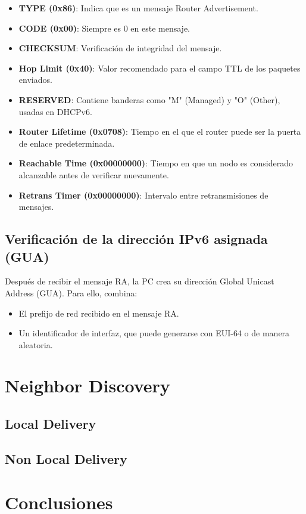 \documentclass[]{article}
\begin{document}
	\begin{itemize}
		\item \textbf{TYPE (0x86)}: Indica que es un mensaje Router Advertisement.
		\item \textbf{CODE (0x00)}: Siempre es 0 en este mensaje.
		\item \textbf{CHECKSUM}: Verificación de integridad del mensaje.
		\item \textbf{Hop Limit (0x40)}: Valor recomendado para el campo TTL de los paquetes enviados.
		\item \textbf{RESERVED}: Contiene banderas como "M" (Managed) y "O" (Other), usadas en DHCPv6.
		\item \textbf{Router Lifetime (0x0708)}: Tiempo en el que el router puede ser la puerta de enlace predeterminada.
		\item \textbf{Reachable Time (0x00000000)}: Tiempo en que un nodo es considerado alcanzable antes de verificar nuevamente.
		\item \textbf{Retrans Timer (0x00000000)}: Intervalo entre retransmisiones de mensajes.
	\end{itemize}
	
	\subsection{\textbf{Verificación de la dirección IPv6 asignada (GUA)}}
	
	Después de recibir el mensaje RA, la PC crea su dirección Global Unicast Address (GUA).  
	Para ello, combina:
	
	\begin{itemize}
		\item El prefijo de red recibido en el mensaje RA.
		\item Un identificador de interfaz, que puede generarse con EUI-64 o de manera aleatoria.
	\end{itemize}
	
	\section{\textbf{Neighbor Discovery}}
	
	\subsection{\textbf{Local Delivery}}
	
	\subsection{\textbf{Non Local Delivery}}
	
	\section{\textbf{Conclusiones}}
	
\end{document}
